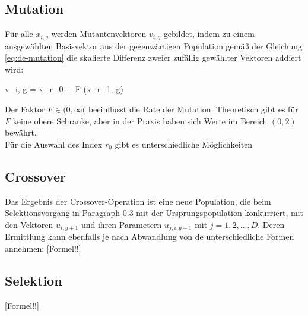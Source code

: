 		\subsection{Mutation}
		\label{sec:de-mutation}
		
			Für alle $x_{i, g}$ werden Mutantenvektoren $v_{i, g}$ gebildet, indem zu einem ausgewählten Basisvektor aus der gegenwärtigen Population gemäß der Gleichung \ref{eq:de-mutation} die skalierte Differenz zweier zufällig gewählter Vektoren addiert wird: 
			\begin{flalign}
				v_{i, g} = x_{r_{0}} + F \cdot (x_{r_{1}, g}) \label{eq:de-mutation}
			\end{flalign}
			Der Faktor $F \in (0,\infty($ beeinflusst die Rate der Mutation. Theoretisch gibt es für $F$ keine obere Schranke, aber in der Praxis haben sich Werte im Bereich $(0,2)$ bewährt.\\
			Für die Auswahl des Index $r_{0}$ gibt es unterschiedliche Möglichkeiten
			
		\subsection{Crossover}
		\label{sec:de-crossover}
		
			Das Ergebnis der Crossover-Operation ist eine neue Population, die 
			beim Selektionsvorgang in Paragraph \ref{sec:de-selection} mit der 
			Ursprungspopulation konkurriert, mit den Vektoren $u_{i, g+1}$ und 
			ihren Parametern $u_{j, i, g+1}$ mit $j = 1, 2, ... , D$. Deren 
			Ermittlung kann ebenfalls je nach Abwandlung von \gls{de} 
			unterschiedliche Formen annehmen:
			\color{red} [Formel!!] \color{black}
			
			
		\subsection{Selektion}
		\label{sec:de-selection}
		\color{red} [Formel!!] \color{black}
